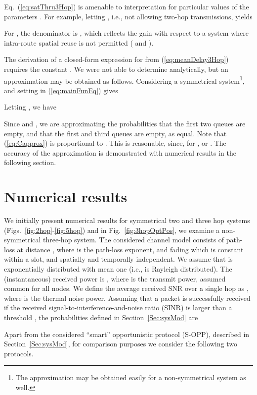 \documentclass[draftclsnofoot,10pt,onecolumn,letterpaper]{IEEEtran}
\begin{document}
Eq.~(\ref{eq:satThru3Hop}) is amenable to interpretation for particular values of the parameters .
For example, letting , i.e., not allowing two-hop transmissions, yields

For , the denominator is , which reflects the gain with respect to a system where intra-route spatial reuse
is not permitted ( and ).

The derivation of a closed-form expression for  from (\ref{eq:meanDelay3Hop}) requires the constant .
We were not able to determine  analytically, but an approximation may be obtained as follows. 
Considering a symmetrical system\footnote{The approximation may be obtained easily for a non-symmetrical system as well.}, and setting  in (\ref{eq:mainFunEq}) gives

Letting , we have

Since  and , we are approximating the probabilities that
the first two queues are empty, and that the first and third
queues are empty, as equal. Note that (\ref{eq:Capprox}) is proportional to . This is reasonable, since, for ,
 or . The accuracy of the approximation is demonstrated with numerical results in the following section. 



\section{Numerical results}
\label{Sec:numRes}

We initially present numerical results for symmetrical two and three hop systems (Figs.~\ref{fig:2hop}-\ref{fig:5hop}) and in Fig.~\ref{fig:3hopOptPos}, we examine a non-symmetrical
three-hop system. The considered channel model consists of path-loss  at distance , where  is the path-loss exponent, and fading 
which is constant within a slot, and spatially and temporally independent. We assume that  is exponentially distributed with mean one (i.e.,  
is Rayleigh distributed). The (instantaneous) received power is , where  is the transmit power, assumed common for all nodes. We define the average received SNR over a single hop as , where  is the thermal noise power. Assuming that a packet is successfully received if the received signal-to-interference-and-noise ratio (SINR) is larger than a threshold , the probabilities  defined in Section~\ref{Sec:sysMod} are


Apart from the considered ``smart'' opportunistic protocol (S-OPP), described in Section~\ref{Sec:sysMod}, for comparison purposes we consider the following two protocols.
\end{document}
